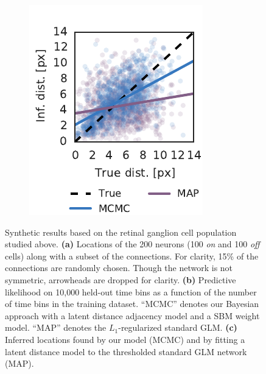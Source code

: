 \begin{figure}[t!]
\begin{subfigure}[b]{1.8in}
    \includegraphics[width=\textwidth]{figures/ch5/synth_rgc_pairwise_distance_scatter.pdf}
    \label{fig:synth_rgc_pairwise_dists}
  \end{subfigure}
  \caption[Synthetic RGC results]{Synthetic results based on the
    retinal ganglion cell population studied above.
    \textbf{(a)} Locations of the 200 neurons (100 \textit{on} and 100 \textit{off} cells) along with a subset of the connections. For clarity, 15\% of the connections are randomly chosen. Though the network is not symmetric, arrowheads are dropped for clarity.
    \textbf{(b)} Predictive likelihood on 10,000 held-out time bins as a function of the number of time bins in the training dataset. ``MCMC'' denotes our Bayesian approach with a latent distance adjacency model and a SBM weight model. ``MAP'' denotes the $L_1$-regularized standard GLM.
    \textbf{(c)} Inferred locations found by our model (MCMC) and by fitting a latent distance model to the thresholded standard GLM network (MAP).
  }
  \label{fig:synth_rgc}
\end{figure}



